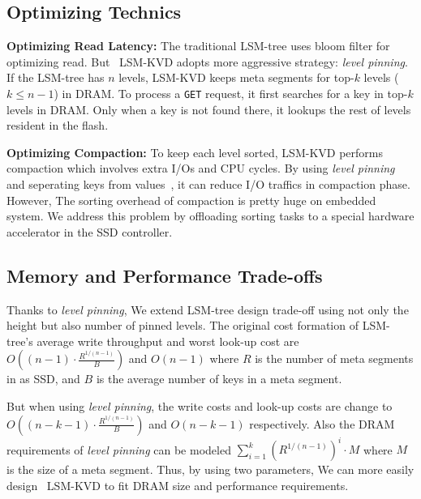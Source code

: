 \documentclass{abstract_hutech}
\newcommand{\ours}{LSM-KVD}
\begin{document}
\vspace{-5pt}
\subsection{Optimizing Technics}\vspace{-5pt}
\textbf{Optimizing Read Latency:}
The traditional LSM-tree uses bloom filter for optimizing read. 
But ~\ours{} adopts more aggressive strategy: \textit{level pinning}. 
If the LSM-tree has $n$ levels, \ours{} keeps meta segments for top-$k$ levels ($k \le n-1$) in DRAM.
To process a \texttt{GET} request, it first searches for a key in top-$k$
levels in DRAM.  Only when a key is not found there, it lookups the rest
of levels resident in the flash.

\textbf{Optimizing Compaction:}
To keep each level sorted, \ours{} performs compaction which involves extra I/Os and CPU cycles.
By using \textit{level pinning} and seperating keys from values{~\cite{wisckey}}, it can reduce I/O traffics in compaction phase. 
However, The sorting overhead of compaction is pretty huge on embedded system. 
We address this problem by offloading sorting tasks to a special hardware accelerator in the SSD controller.

\vspace{-5pt}
\subsection{Memory and Performance Trade-offs}\vspace{-5pt}
Thanks to \textit{level pinning}, We extend LSM-tree design trade-off using not only the height but also number of pinned levels. 
The original cost formation of LSM-tree's average write throughput and worst look-up cost are 
$O((n-1)\cdot\frac{R^{1/(n-1)}}{B})$ and $O(n-1)$ 
where $R$ is the number of meta segments in as SSD, and $B$ is the average number of keys in a meta segment.

But when using \textit{level pinning}, 
the write costs and look-up costs are change to $O((n-k-1)\cdot\frac{R^{1/(n-1)}}{B})$ and $O(n-k-1)$ respectively.
Also the DRAM requirements of \textit{level pinning} can be modeled $\sum_{i=1}^{k}(R^{1/(n-1)})^i\cdot M$ where $M$ is the size of a meta segment.
Thus, by using two parameters, We can more easily design ~\ours{} to fit DRAM size and performance requirements.

\vspace{-5pt}
\end{document}
